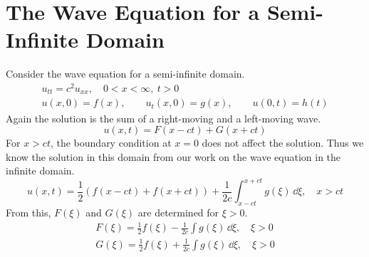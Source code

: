 \section{The Wave Equation for a Semi-Infinite Domain}





Consider the wave equation for a semi-infinite domain.
\begin{gather*}
  u_{t t} = c^2 u_{x x}, \quad 0 <  x < \infty, \ t > 0 \\
  u(x,0) = f(x), \qquad u_t(x,0) = g(x), \qquad u(0,t) = h(t)
\end{gather*}
Again the solution is the sum of a right-moving and a left-moving wave.
\[
u(x,t) = F(x - c t) + G(x + c t)
\]
For $x > c t$, the boundary condition at $x = 0$ does not affect the solution.
Thus we know the solution in this domain from our work on the wave equation
in the infinite domain.
\[
u(x,t) = \frac{1}{2} \left( f(x - c t) + f(x + c t) \right)
+ \frac{1}{2c} \int_{x - c t}^{x + c t} g(\xi) \,\dd \xi, \quad x > c t
\]
From this, $F(\xi)$ and $G(\xi)$ are determined for $\xi > 0$.
\begin{gather*}
  F(\xi) = \frac{1}{2} f(\xi) - \frac{1}{2c} \int g(\xi) \,\dd \xi, \quad \xi > 0
  \\
  G(\xi) = \frac{1}{2} f(\xi) + \frac{1}{2c} \int g(\xi) \,\dd \xi, \quad \xi > 0
\end{gather*}

